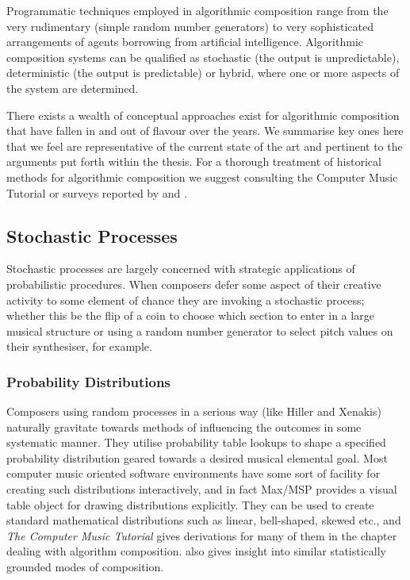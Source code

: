 Programmatic techniques employed in algorithmic composition range from the very rudimentary (simple random number generators) to very sophisticated arrangements of agents borrowing from artificial intelligence. Algorithmic composition systems can be qualified as stochastic (the output is unpredictable), deterministic (the output is predictable) or hybrid, where one or more aspects of the system are determined.

There exists a wealth of conceptual approaches exist for algorithmic composition that have fallen in and out of flavour over the years. We summarise key ones here that we feel are representative of the current state of the art and pertinent to the arguments put forth within the thesis. For a thorough treatment of historical methods for algorithmic composition we suggest consulting the Computer Music Tutorial \citep{Roads1996} or surveys reported by \cite{Fernandez2013} and \cite{Papadopoulos1999}.

\subsection{Stochastic Processes}

Stochastic processes are largely concerned with strategic applications of probabilistic procedures. When composers defer some aspect of their creative activity to some element of chance they are invoking a stochastic process; whether this be the flip of a coin to choose which section to enter in a large musical structure or using a random number generator to select pitch values on their synthesiser, for example.

\subsubsection{Probability Distributions}

Composers using random processes in a serious way (like Hiller and Xenakis) naturally gravitate towards methods of influencing the outcomes in some systematic manner. They  utilise probability table lookups to shape a specified probability distribution geared towards a desired musical elemental goal. Most computer music oriented software environments have some sort of facility for creating such distributions interactively, and in fact Max/MSP provides a visual table object for drawing distributions explicitly. They can be used to create standard mathematical distributions such as linear, bell-shaped, skewed etc., and \textit{The Computer Music Tutorial} \citep{Roads1996} gives derivations for many of them in the chapter dealing with algorithm composition. \cite{Ames1990a} also gives insight into similar statistically grounded modes of composition.


